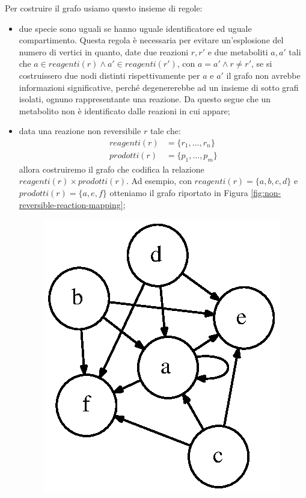 Per costruire il grafo usiamo questo insieme di regole:
\begin{itemize}
\item due specie sono uguali se hanno uguale identificatore ed uguale
  compartimento. Questa regola \`e necessaria per evitare
  un'esplosione del numero di vertici in quanto, date due reazioni $r,
  r'$ e due metaboliti $a, a'$ tali che $a \in reagenti(r) \wedge a'
  \in reagenti(r')$, con $a = a' \wedge r \not = r'$, se si
  costruissero due nodi distinti rispettivamente per $a$ e $a'$ il
  grafo non avrebbe informazioni significative, perch\'e degenererebbe
  ad un insieme di sotto grafi isolati, ognuno rappresentante una
  reazione. Da questo segue che un metabolito non \`e identificato
  dalle reazioni in cui appare;
\item data una reazione non reversibile $r$ tale che:
  \begin{displaymath}
    \begin{split} 
      reagenti(r) &= \{ r_{1}, \ldots, r_{n} \} \\
      prodotti(r) &= \{ p_{1}, \ldots, p_{m} \}
    \end{split}
  \end{displaymath}
  allora costruiremo il grafo che codifica la relazione $reagenti(r)
  \times prodotti(r)$. Ad esempio, con $reagenti(r) = \{ a, b, c, d
  \}$ e $prodotti(r) = \{a, e, f\}$ otteniamo il grafo riportato in
  Figura \ref{fig:non-reversible-reaction-mapping};
  \begin{figure}
    \centering
    \includegraphics{images/non-reversible-reaction-example.dot.eps}

\end{figure}
\end{itemize}
